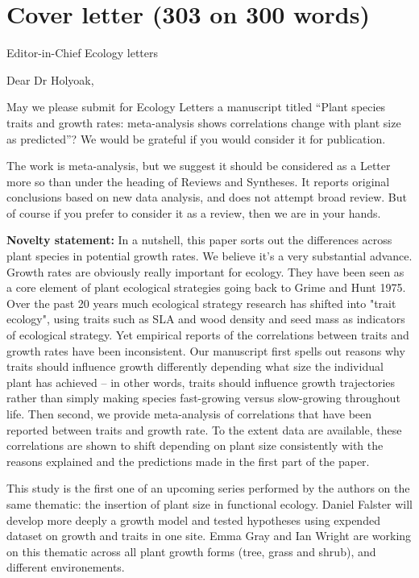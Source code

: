 \documentclass[a4paper]{article}\usepackage[]{graphicx}\usepackage[]{color}
\begin{document}
\section*{Cover letter (303 on 300 words)}\label{Proposal}

Editor-in-Chief Ecology letters


Dear Dr Holyoak,




May we please submit for Ecology Letters a manuscript titled “Plant species traits and growth rates: meta-analysis shows correlations change with plant size as predicted”? We would be grateful if you would consider it for publication.

The work is meta-analysis, but we suggest it should be considered as a Letter more so than under the heading of Reviews and Syntheses. It reports original conclusions based on new data analysis, and does not attempt broad review. But of course if you prefer to consider it as a review, then we are in your hands.


\textbf{Novelty statement:}
In a nutshell, this paper sorts out the differences across plant species in potential growth rates. We believe it's a very substantial advance. Growth rates are obviously really important for ecology. They have been seen as a core element of plant ecological strategies going back to Grime and Hunt 1975. Over the past 20 years much ecological strategy research has shifted into "trait ecology", using traits such as SLA and wood density and seed mass as indicators of ecological strategy. Yet empirical reports of the correlations between traits and growth rates have been inconsistent. Our manuscript first spells out reasons why traits should influence growth differently depending what size the individual plant has achieved -- in other words, traits should influence growth trajectories rather than simply making species fast-growing versus slow-growing throughout life. Then second, we provide meta-analysis of correlations that have been reported between traits and growth rate. To the extent data are available, these correlations are shown to shift depending on plant size consistently with the reasons explained and the predictions made in the first part of the paper.  

This study is the first one of an upcoming series performed by the authors on the same thematic: the insertion of plant size in functional ecology. Daniel Falster will develop more deeply a growth model and tested hypotheses using expended dataset on growth and traits in one site. Emma Gray and Ian Wright are working on this thematic across all plant growth forms (tree, grass and shrub), and different environements.    
\end{document}
